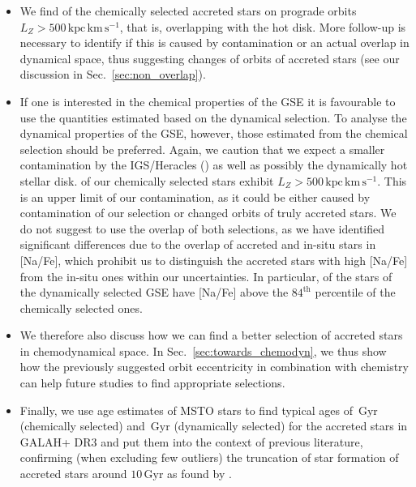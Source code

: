\documentclass[fleqn,usenatbib]{mnras}
\newcommand{\Gyr}{\,\mathrm{Gyr}}	%
\newcommand{\kpckms}{\,\mathrm{kpc\,km\,s^{-1}}}	%
\begin{document}
\begin{itemize}
\item We find  of the chemically selected accreted stars on prograde orbits $L_Z > 500 \kpckms$, that is, overlapping with the hot disk. More follow-up is necessary to identify if this is caused by contamination or an actual overlap in dynamical space, thus suggesting changes of orbits of accreted stars (see our discussion in Sec.~\ref{sec:non_overlap}).
\item If one is interested in the chemical properties of the GSE it is favourable to use the quantities estimated based on the dynamical selection. To analyse the dynamical properties of the GSE, however, those estimated from the chemical selection should be preferred. Again, we caution that we expect a smaller contamination by the IGS/Heracles () as well as possibly the dynamically hot stellar disk.  of our chemically selected stars exhibit $L_Z > 500\kpckms$. This is an upper limit of our contamination, as it could be either caused by contamination of our selection or changed orbits of truly accreted stars. We do not suggest to use the overlap of both selections, as we have identified significant differences due to the overlap of accreted and in-situ stars in [Na/Fe], which prohibit us to distinguish the accreted stars with high [Na/Fe] from the in-situ ones within our uncertainties. In particular,  of the stars of the dynamically selected GSE have [Na/Fe] above the $84^\text{th}$ percentile of the chemically selected ones.
\item We therefore also discuss how we can find a better selection of accreted stars in chemodynamical space. In Sec.~\ref{sec:towards_chemodyn}, we thus show how the previously suggested orbit eccentricity \citep[see e.g.][]{Mackereth2019, Naidu2020} in combination with chemistry can help future studies to find appropriate selections.
\item Finally, we use age estimates of MSTO stars to find typical ages of $\Gyr$ (chemically selected) and $\Gyr$ (dynamically selected) for the accreted stars in GALAH+ DR3 and put them into the context of previous literature, confirming (when excluding few outliers) the truncation of star formation of accreted stars around $10\Gyr$ as found by \citet{Bonaca2020}.
\end{itemize}

\end{document}
